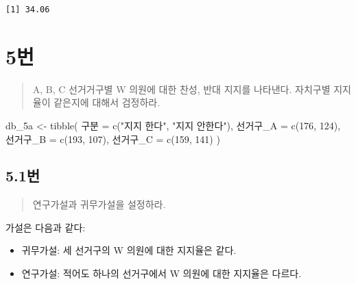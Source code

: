 \documentclass[
  letterpaper,
  DIV=11,
  numbers=noendperiod]{scrreprt}
\newenvironment{Shaded}{\begin{snugshade}}{\end{snugshade}}
\newcommand{\AttributeTok}[1]{\textcolor[rgb]{0.40,0.45,0.13}{#1}}
\newcommand{\DecValTok}[1]{\textcolor[rgb]{0.68,0.00,0.00}{#1}}
\newcommand{\FunctionTok}[1]{\textcolor[rgb]{0.28,0.35,0.67}{#1}}
\newcommand{\NormalTok}[1]{\textcolor[rgb]{0.00,0.23,0.31}{#1}}
\newcommand{\OtherTok}[1]{\textcolor[rgb]{0.00,0.23,0.31}{#1}}
\newcommand{\StringTok}[1]{\textcolor[rgb]{0.13,0.47,0.30}{#1}}
\providecommand{\tightlist}{%
  \setlength{\itemsep}{0pt}\setlength{\parskip}{0pt}}\usepackage{longtable,booktabs,array}
\begin{document}
\begin{verbatim}
[1] 34.06
\end{verbatim}

\hypertarget{uxbc88-29}{%
\chapter*{5번}\label{uxbc88-29}}


\begin{quote}
A, B, C 선거거구별 W 의원에 대한 찬성, 반대 지지를 나타낸다. 자치구별
지지율이 같은지에 대해서 검정하라.
\end{quote}

\begin{Shaded}
\begin{Highlighting}[]
\NormalTok{db\_5a }\OtherTok{\textless{}{-}} \FunctionTok{tibble}\NormalTok{(}
\NormalTok{  구분 }\OtherTok{=} \FunctionTok{c}\NormalTok{(}\StringTok{"지지 한다"}\NormalTok{, }\StringTok{"지지 안한다"}\NormalTok{),}
\NormalTok{  선거구}\AttributeTok{\_A =} \FunctionTok{c}\NormalTok{(}\DecValTok{176}\NormalTok{, }\DecValTok{124}\NormalTok{),}
\NormalTok{  선거구}\AttributeTok{\_B =} \FunctionTok{c}\NormalTok{(}\DecValTok{193}\NormalTok{, }\DecValTok{107}\NormalTok{),}
\NormalTok{  선거구}\AttributeTok{\_C =} \FunctionTok{c}\NormalTok{(}\DecValTok{159}\NormalTok{, }\DecValTok{141}\NormalTok{)}
\NormalTok{)}
\end{Highlighting}
\end{Shaded}

\hypertarget{uxbc88-30}{%
\section*{5.1번}\label{uxbc88-30}}


\begin{quote}
연구가설과 귀무가설을 설정하라.
\end{quote}

가설은 다음과 같다:

\begin{itemize}
\tightlist
\item
  귀무가설: 세 선거구의 W 의원에 대한 지지율은 같다.
\item
  연구가설: 적어도 하나의 선거구에서 W 의원에 대한 지지율은 다르다.
\end{itemize}
\end{document}
